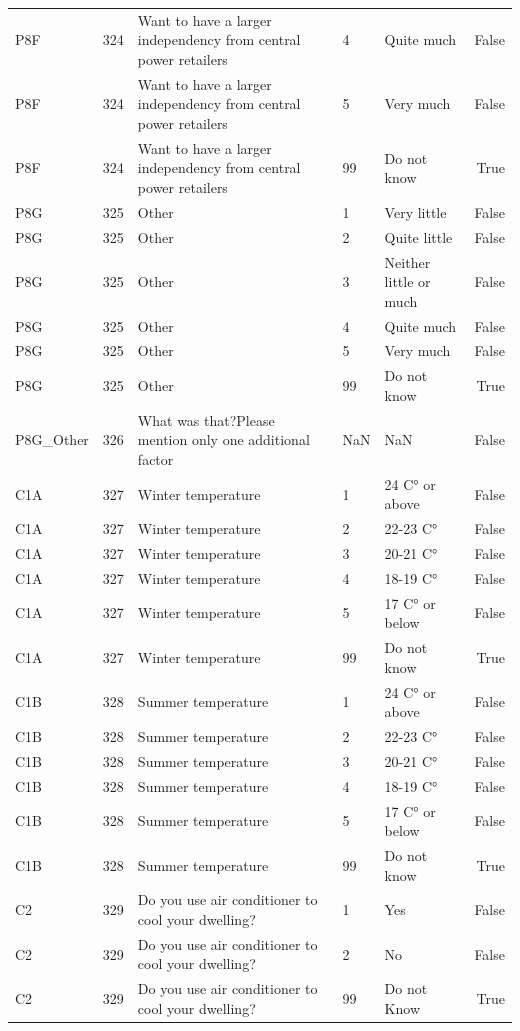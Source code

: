 \begin{tabular}{lrlllr}
P8F & 324 & Want to have a larger independency from central power retailers & 4 & Quite much & False \\
P8F & 324 & Want to have a larger independency from central power retailers & 5 & Very much & False \\
P8F & 324 & Want to have a larger independency from central power retailers & 99 & Do not know & True \\
P8G & 325 & Other & 1 & Very little & False \\
P8G & 325 & Other & 2 & Quite little & False \\
P8G & 325 & Other & 3 & Neither little or much & False \\
P8G & 325 & Other & 4 & Quite much & False \\
P8G & 325 & Other & 5 & Very much & False \\
P8G & 325 & Other & 99 & Do not know & True \\
P8G_Other & 326 & What was that?Please mention only one additional factor & NaN & NaN & False \\
C1A & 327 & Winter temperature & 1 & 24 C° or above & False \\
C1A & 327 & Winter temperature & 2 & 22-23 C° & False \\
C1A & 327 & Winter temperature & 3 & 20-21 C° & False \\
C1A & 327 & Winter temperature & 4 & 18-19 C° & False \\
C1A & 327 & Winter temperature & 5 & 17 C° or below & False \\
C1A & 327 & Winter temperature & 99 & Do not know & True \\
C1B & 328 & Summer temperature & 1 & 24 C° or above & False \\
C1B & 328 & Summer temperature & 2 & 22-23 C° & False \\
C1B & 328 & Summer temperature & 3 & 20-21 C° & False \\
C1B & 328 & Summer temperature & 4 & 18-19 C° & False \\
C1B & 328 & Summer temperature & 5 & 17 C° or below & False \\
C1B & 328 & Summer temperature & 99 & Do not know & True \\
C2 & 329 & Do you use air conditioner to cool your dwelling?   & 1 & Yes & False \\
C2 & 329 & Do you use air conditioner to cool your dwelling?   & 2 & No & False \\
C2 & 329 & Do you use air conditioner to cool your dwelling?   & 99 & Do not Know & True \\

\end{tabular}
